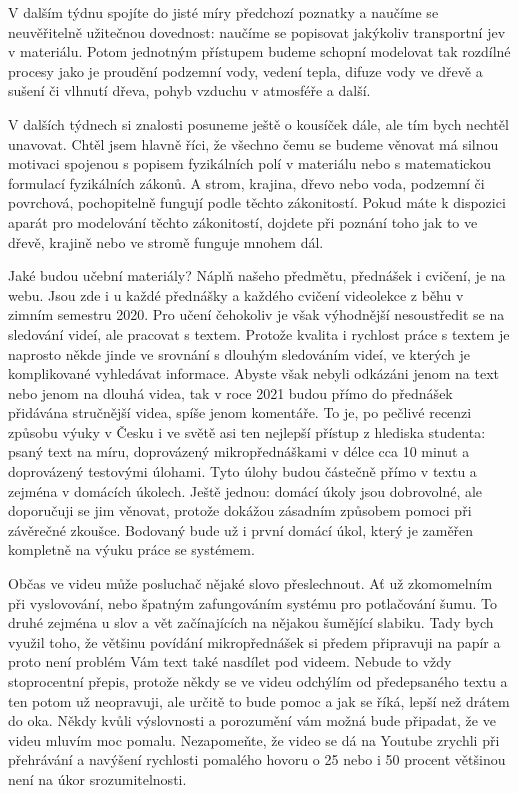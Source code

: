 \documentclass[12pt]{article}
\begin{document}
V dalším týdnu spojíte do jisté míry předchozí poznatky a naučíme se neuvěřitelně užitečnou dovednost: naučíme se popisovat jakýkoliv transportní jev v materiálu. Potom jednotným přístupem budeme schopní modelovat tak rozdílné procesy jako je proudění podzemní vody, vedení tepla, difuze vody ve dřevě a sušení či vlhnutí dřeva, pohyb vzduchu v atmosféře a další.

V dalších týdnech si znalosti posuneme ještě o kousíček dále, ale tím bych nechtěl unavovat. Chtěl jsem hlavně říci, že všechno čemu se budeme věnovat má silnou motivaci spojenou s popisem fyzikálních polí v materiálu nebo s matematickou formulací fyzikálních zákonů. A strom, krajina, dřevo nebo voda, podzemní či povrchová, pochopitelně fungují podle těchto zákonitostí. Pokud máte k dispozici aparát pro modelování těchto zákonitostí, dojdete při poznání toho jak to ve dřevě, krajině nebo ve stromě funguje mnohem dál.

Jaké budou učební materiály? Náplň našeho předmětu, přednášek i cvičení, je na webu. Jsou zde i u každé přednášky a každého cvičení videolekce z běhu v zimním semestru 2020. Pro učení čehokoliv je však výhodnější nesoustředit se na sledování videí, ale pracovat s textem. Protože kvalita i rychlost práce s textem je naprosto někde jinde ve srovnání s dlouhým sledováním videí, ve kterých je komplikované vyhledávat informace. Abyste však nebyli odkázáni jenom na text nebo jenom na dlouhá videa, tak v roce 2021 budou přímo do přednášek přidávána stručnější videa, spíše jenom komentáře. To je, po pečlivé recenzi způsobu výuky v Česku i ve světě asi ten nejlepší přístup z hlediska studenta: psaný text na míru, doprovázený mikropřednáškami v délce cca 10 minut a doprovázený testovými úlohami. Tyto úlohy budou částečně přímo v textu a zejména v domácích úkolech. Ještě jednou: domácí úkoly jsou dobrovolné, ale doporučuji se jim věnovat, protože dokážou zásadním způsobem pomoci při závěrečné zkoušce. Bodovaný bude už i první domácí úkol, který je zaměřen kompletně na výuku práce se systémem.

Občas ve videu může posluchač nějaké slovo přeslechnout. Ať už zkomomelním při vyslovování, nebo špatným zafungováním systému pro potlačování šumu. To druhé zejména u slov a vět začínajících na nějakou šumějící slabiku. Tady bych využil toho, že většinu povídání mikropřednášek si předem připravuji na papír a proto není problém Vám text také nasdílet pod videem. Nebude to vždy stoprocentní přepis, protože někdy se ve videu odchýlím od předepsaného textu a ten potom už neopravuji, ale určitě to bude pomoc a jak se říká, lepší než drátem do oka. Někdy kvůli výslovnosti a porozumění vám možná bude připadat, že ve videu mluvím moc pomalu. Nezapomeňte, že video se dá na Youtube zrychli při přehrávání a navýšení rychlosti pomalého hovoru o 25 nebo i 50 procent většinou není na úkor srozumitelnosti. 
\end{document}
